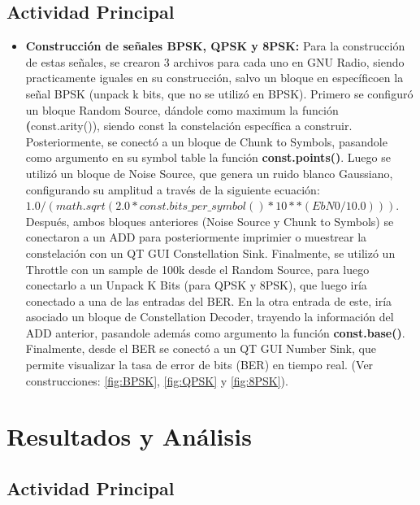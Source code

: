 \documentclass[12pt]{article}
\begin{document}
\subsection{Actividad Principal}
\begin{itemize}
    \item \textbf{Construcción de señales BPSK, QPSK y 8PSK:} Para la construcción de estas señales, se crearon 3 archivos para cada uno en GNU Radio, siendo practicamente iguales en su construcción, salvo un bloque en específicoen la señal BPSK  (unpack k bits, que no se utilizó en BPSK). Primero se configuró un bloque Random Source, dándole como maximum la función \textbf(const.arity()), siendo const la constelación específica a construir. Posteriormente, se conectó a un bloque de Chunk to Symbols, pasandole como argumento en su symbol table la función \textbf{const.points()}. Luego se utilizó un bloque de Noise Source, que genera un ruido blanco Gaussiano, configurando su amplitud a través de la siguiente ecuación: $1.0/(math.sqrt (2.0 * const.bits\_per\_symbol()  * 10 ** (EbN0 / 10.0)))$. Después, ambos bloques anteriores (Noise Source y Chunk to Symbols) se conectaron a un ADD para posteriormente imprimier o muestrear la constelación con un QT GUI Constellation Sink. Finalmente, se utilizó un Throttle con un sample de 100k desde el Random Source, para luego conectarlo a un Unpack K Bits (para QPSK y 8PSK), que luego iría conectado a una de las entradas del BER. En la otra entrada de este, iría asociado un bloque de Constellation Decoder, trayendo la información del ADD anterior, pasandole además como argumento la función \textbf{const.base()}. Finalmente, desde el BER se conectó a un QT GUI Number Sink, que permite visualizar la tasa de error de bits (BER) en tiempo real. (Ver construcciones: \ref{fig:BPSK}, \ref{fig:QPSK} y \ref{fig:8PSK}).

\end{itemize}

\section{Resultados y Análisis}

\subsection{Actividad Principal}
\end{document}
